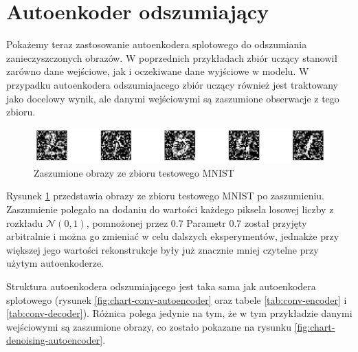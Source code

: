 \documentclass[12pt]{mwbk}
\theoremstyle{plain}
\theoremstyle{definition}
\theoremstyle{remark}
\newcommand\zrodlo[1]{\par\vspace{-3mm}{\small\textit{Źródło: }#1 }}
\begin{document}
\section{Autoenkoder odszumiający}

Pokażemy teraz zastosowanie autoenkodera splotowego do odszumiania zanieczyszczonych obrazów. W poprzednich przykładach zbiór uczący stanowił zarówno dane wejściowe, jak i oczekiwane dane wyjściowe w modelu. W przypadku autoenkodera odszumiajacego zbiór uczący również jest traktowany jako docelowy wynik, ale danymi wejściowymi są zaszumione obserwacje z tego zbioru.



\begin{figure}[!h]
	\centering
	\includegraphics[width=\linewidth]{rys2/MNIST_noisy.png}
	\caption{Zaszumione obrazy ze zbioru testowego MNIST}
	\label{fig:MNIST-noisy}
	\zrodlo{Opracowanie własne}
\end{figure}

Rysunek \ref{fig:MNIST-noisy} przedstawia obrazy ze zbioru testowego MNIST po zaszumieniu. Zaszumienie polegało na dodaniu do wartości każdego piksela losowej liczby z rozkładu $\mathcal{N}(0,1)$, pomnożonej przez 0.7 Parametr 0.7 został przyjęty arbitralnie i można go zmieniać w celu dalszych eksperymentów, jednakże przy większej jego wartości rekonstrukcje były już znacznie mniej czytelne przy użytym autoenkoderze.

Struktura autoenkodera odszumiającego jest taka sama jak autoenkodera splotowego (rysunek \ref{fig:chart-conv-autoencoder} oraz tabele \ref{tab:conv-encoder} i \ref{tab:conv-decoder}). Różnica polega jedynie na tym, że w tym przykładzie danymi wejściowymi są zaszumione obrazy, co zostało pokazane na rysunku \ref{fig:chart-denoising-autoencoder}. 
\end{document}
